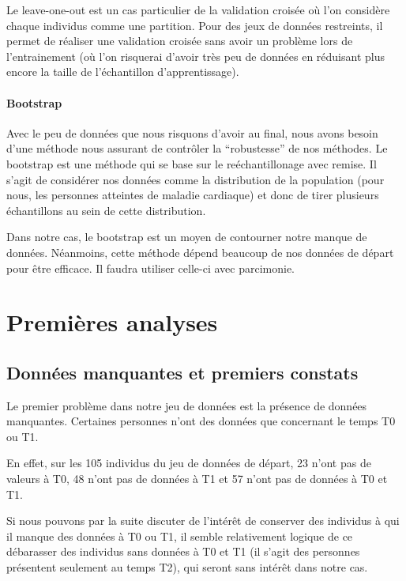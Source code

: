 \documentclass[]{article}
\let\oldparagraph\paragraph
\renewcommand{\paragraph}[1]{\oldparagraph{#1}\mbox{}}
\begin{document}
Le leave-one-out est un cas particulier de la validation croisée où l'on
considère chaque individus comme une partition. Pour des jeux de données
restreints, il permet de réaliser une validation croisée sans avoir un
problème lors de l'entrainement (où l'on risquerai d'avoir très peu de
données en réduisant plus encore la taille de l'échantillon
d'apprentissage).

\hypertarget{bootstrap}{%
\paragraph{Bootstrap}\label{bootstrap}}

Avec le peu de données que nous risquons d'avoir au final, nous avons
besoin d'une méthode nous assurant de contrôler la ``robustesse'' de nos
méthodes. Le bootstrap est une méthode qui se base sur le
reéchantillonage avec remise. Il s'agit de considérer nos données comme
la distribution de la population (pour nous, les personnes atteintes de
maladie cardiaque) et donc de tirer plusieurs échantillons au sein de
cette distribution.

Dans notre cas, le bootstrap est un moyen de contourner notre manque de
données. Néanmoins, cette méthode dépend beaucoup de nos données de
départ pour être efficace. Il faudra utiliser celle-ci avec parcimonie.

\newpage

\hypertarget{premieres-analyses}{%
\section{Premières analyses}\label{premieres-analyses}}

\hypertarget{donnees-manquantes-et-premiers-constats}{%
\subsection{Données manquantes et premiers
constats}\label{donnees-manquantes-et-premiers-constats}}

Le premier problème dans notre jeu de données est la présence de données
manquantes. Certaines personnes n'ont des données que concernant le
temps T0 ou T1.

En effet, sur les 105 individus du jeu de données de départ, 23 n'ont
pas de valeurs à T0, 48 n'ont pas de données à T1 et 57 n'ont pas de
données à T0 et T1.

Si nous pouvons par la suite discuter de l'intérêt de conserver des
individus à qui il manque des données à T0 ou T1, il semble relativement
logique de ce débarasser des individus sans données à T0 et T1 (il
s'agit des personnes présentent seulement au temps T2), qui seront sans
intérêt dans notre cas.
\end{document}

